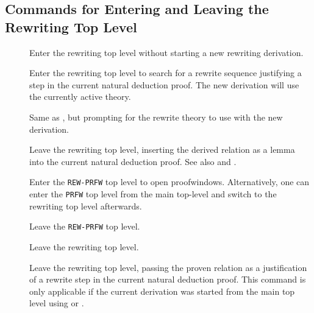 \subsection{Commands for Entering and Leaving the Rewriting Top Level}
  \begin{description}
  \item[]  Enter the rewriting top level without
    starting a new rewriting derivation.
  \item[]  Enter the rewriting top level to search for a
    rewrite sequence justifying a step in the current natural deduction proof.
    The new derivation will use the currently active theory.
  \item[]  Same as , but
    prompting for the rewrite theory to use with the new derivation.
  \item[]  Leave the rewriting top level, inserting
    the derived relation as a lemma into the current natural deduction proof.
    See also  and .
  \item[]  Enter the \texttt{REW-PRFW} top level to
    open proofwindows.
    Alternatively, one can enter the \texttt{PRFW} top level from the main
    top-level and switch to the rewriting top level afterwards.
  \item[]  Leave the \texttt{REW-PRFW} top level.
  \item[]  Leave the rewriting top level.
  \item[]  Leave the rewriting top level, passing the proven
    relation as a justification of a rewrite step in the current natural
    deduction proof. This command is only applicable if the current derivation
    was started from the main top level using  or
    .
  \end{description}

